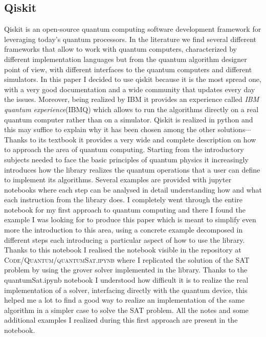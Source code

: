 \documentclass[english]{article}
\begin{document}
	\clearpage
	\begin{appendices}
		\section{Qiskit}
		\label{sec:qiskit}
			Qiskit is an open-source quantum computing software development framework for leveraging today's quantum processors. In the literature we find several different frameworks that allow to work with quantum computers, characterized by different implementation languages but from the quantum algorithm designer point of view, with different interfaces to the quantum computers and different simulators. In this paper I decided to use qiskit because it is the most spread one, with a very good documentation and a wide community that updates every day the issues. Moreover, being realized by IBM it provides an experience called \emph{IBM quantum experience}(IBMQ) which allows to run the algorithms directly on a real quantum computer rather than on a simulator. Qiskit is realized in python and this may suffice to explain why it has been chosen among the other solutions$\cdots$\\
			
			Thanks to its textbook \cite{qiskitTextbook} it provides a very wide and complete description on how to approach the area of quantum computing. Starting from the introductory subjects needed to face the basic principles of quantum physics it increasingly introduces how the library realizes the quantum operations that a user can define to implement its algorithms. Several examples are provided with jupyter notebooks where each step can be analysed in detail understanding how and what each instruction from the library does. I completely went through the entire notebook for my first approach to quantum computing and there I found the example I was looking for to produce this paper which is meant to simplify even more the introduction to this area, using a concrete example decomposed in different steps each introducing a particular aspect of how to use the library. Thanks to this notebook I realised the notebook visible in the repository at \textsc{Code/Quantum/quantumSat.ipynb} where I replicated the solution of the SAT problem by using the grover solver implemented in the library. Thanks to the quantumSat.ipynb notebook I understood how difficult it is to realize the real implementation of a solver, interfacing directly with the quantum device, this helped me a lot to find a good way to realize an implementation of the same algorithm in a simpler case to solve the SAT problem. All the notes and some additional examples I realized during this first approach are present in the notebook. \\
			

\end{appendices}
\end{document}
